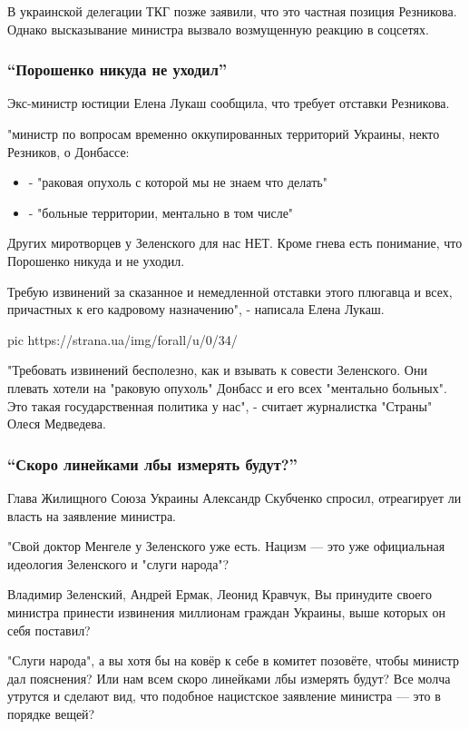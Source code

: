 В украинской делегации ТКГ позже заявили, что это частная позиция Резникова.
Однако высказывание министра вызвало возмущенную реакцию в соцсетях. 

\subsubsection{\enquote{Порошенко никуда не уходил}}

Экс-министр юстиции Елена Лукаш сообщила, что требует отставки Резникова.

"министр по вопросам временно оккупированных территорий Украины, некто
Резников, о Донбассе:

\begin{itemize}
	\item - "раковая опухоль с которой мы не знаем что делать" 
	\item - "больные территории, ментально в том числе"
\end{itemize}

Других миротворцев у Зеленского для нас НЕТ.  Кроме гнева есть понимание, что
Порошенко никуда и не уходил.

Требую извинений за сказанное и немедленной отставки этого плюгавца и всех,
причастных к его кадровому назначению", - написала Елена Лукаш.

\ifcmt
pic https://strana.ua/img/forall/u/0/34/%
\fi

"Требовать извинений бесполезно, как и взывать к совести Зеленского. Они
плевать хотели на "раковую опухоль" Донбасс и его всех "ментально больных". Это
такая государственная политика у нас", - считает журналистка "Страны" Олеся
Медведева.

\subsubsection{\enquote{Скоро линейками лбы измерять будут?}}

Глава Жилищного Союза Украины Александр Скубченко спросил, отреагирует ли
власть на заявление министра.

"Свой доктор Менгеле у Зеленского уже есть. Нацизм --- это уже официальная
идеология Зеленского и "слуги народа"?

Владимир Зеленский, Андрей Ермак, Леонид Кравчук, Вы принудите своего министра
принести извинения миллионам граждан Украины, выше которых он себя поставил?

"Слуги народа", а вы хотя бы на ковёр к себе в комитет позовёте, чтобы министр
дал пояснения? Или нам всем скоро линейками лбы измерять будут? Все молча
утрутся и сделают вид, что подобное нацистское заявление министра --- это в
порядке вещей?

